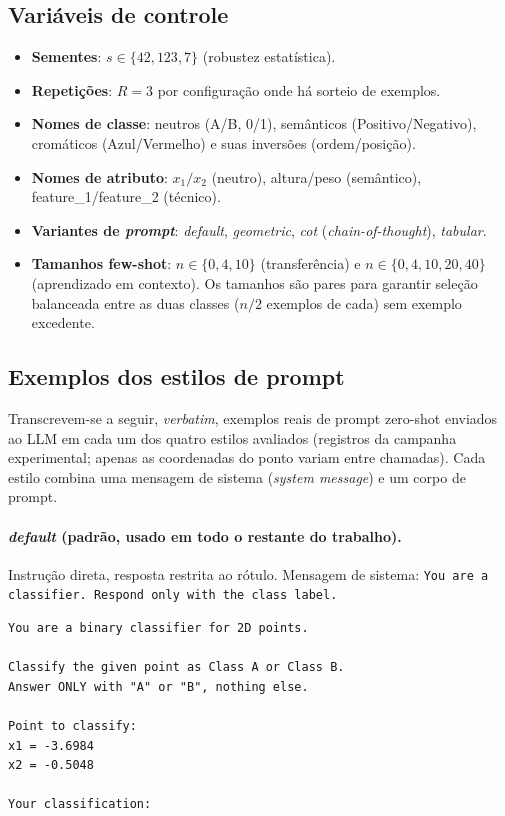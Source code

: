 \documentclass[12pt,a4paper]{article}
\begin{document}
\subsection{Variáveis de controle}

\begin{itemize}
  \item \textbf{Sementes}: $s \in \{42, 123, 7\}$ (robustez estatística).
  \item \textbf{Repetições}: $R = 3$ por configuração onde há sorteio de exemplos.
  \item \textbf{Nomes de classe}: neutros (A/B, 0/1), semânticos (Positivo/Negativo),
    cromáticos (Azul/Vermelho) e suas inversões (ordem/posição).
  \item \textbf{Nomes de atributo}: $x_1/x_2$ (neutro), altura/peso (semântico),
    feature\_1/feature\_2 (técnico).
  \item \textbf{Variantes de \emph{prompt}}: \emph{default}, \emph{geometric}, \emph{cot}
    (\emph{chain-of-thought}), \emph{tabular}.
  \item \textbf{Tamanhos few-shot}: $n \in \{0,4,10\}$ (transferência) e
    $n \in \{0,4,10,20,40\}$ (aprendizado em contexto). Os tamanhos são pares para
    garantir seleção
    balanceada entre as duas classes ($n/2$ exemplos de cada) sem exemplo excedente.
\end{itemize}

\subsection{Exemplos dos estilos de prompt}
\label{ap:prompts}

Transcrevem-se a seguir, \emph{verbatim}, exemplos reais de prompt zero-shot enviados ao
LLM em cada um dos quatro estilos avaliados (registros da campanha experimental; apenas as
coordenadas do ponto variam entre chamadas). Cada estilo combina uma mensagem de sistema
(\emph{system message}) e um corpo de prompt.

\paragraph{\emph{default} (padrão, usado em todo o restante do trabalho).}
Instrução direta, resposta restrita ao rótulo.
Mensagem de sistema: \texttt{You are a classifier. Respond only with the class label.}
\begin{verbatim}
You are a binary classifier for 2D points.

Classify the given point as Class A or Class B.
Answer ONLY with "A" or "B", nothing else.

Point to classify:
x1 = -3.6984
x2 = -0.5048

Your classification:
\end{verbatim}
\end{document}
